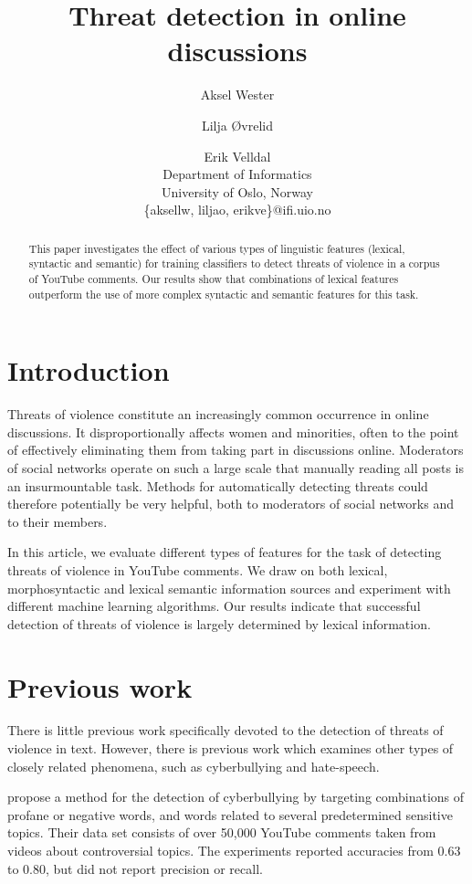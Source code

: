 \documentclass[11pt,letterpaper]{article}
\title{Threat detection in online discussions}
\author{Aksel Wester \and Lilja Øvrelid \and Erik Velldal \\
  Department of Informatics \\
  University of Oslo, Norway \\
  \{aksellw, liljao, erikve\}@ifi.uio.no}
\date{}
\begin{document}
\maketitle

\begin{abstract}
This paper investigates the effect of various types of linguistic features (lexical, syntactic and semantic) for training classifiers to detect threats of violence in a corpus of YouTube comments. %
Our results show that combinations of lexical features outperform the use of more complex syntactic and semantic features for this task.
\end{abstract}

\section{Introduction}
\label{sec:intro}
Threats of violence constitute an increasingly common occurrence in online discussions. It disproportionally affects women and minorities, often to the point of effectively eliminating them from taking part in discussions online. Moderators of social networks operate on such a large scale that manually reading all posts is an insurmountable task. Methods for automatically detecting threats could therefore potentially be very helpful, both to moderators of social networks and to their members.

In this article, we evaluate different types of features for the task of detecting threats of violence in YouTube comments. We draw on both lexical, morphosyntactic and lexical semantic information sources and experiment with different machine learning algorithms. Our results indicate that successful detection of threats of violence is largely determined by lexical information.

\section{Previous work}
\label{sec:prev}
There is little previous work specifically devoted to the detection of threats of violence in text. However, there is previous work which examines other types of closely related phenomena, such as cyberbullying and hate-speech.

 propose a method for the detection of cyberbullying by targeting combinations of profane or negative words, and words related to several predetermined sensitive topics. Their data set consists of over 50,000 YouTube comments taken from videos about controversial topics. %
The experiments reported accuracies from 0.63 to 0.80, but did not report precision or recall.
\end{document}
